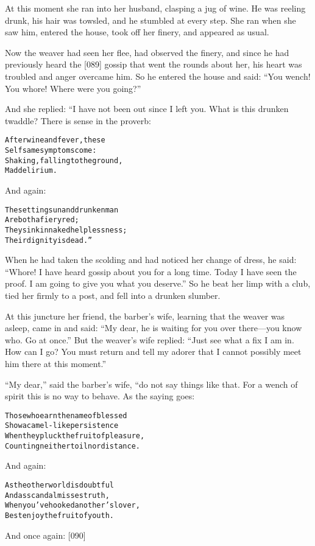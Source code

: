 \documentclass{article}
\renewenvironment{verbatim}{\begin{alltt}\normalfont\begin{centering}}{\end{centering}\end{alltt}}
\begin{document}
At this moment she ran into her husband, clasping a jug of wine. He
was reeling drunk, his hair was towsled, and he stumbled at every
step. She ran when she saw him, entered the house, took off her
finery, and appeared as usual.

Now the weaver had seen her flee, had observed the finery, and
since he had previously heard the [089] gossip that went the rounds
about her, his heart was troubled and anger overcame him. So he
entered the house and said:
``You wench! You whore! Where were you going?''

And she replied: “I have not been out since I left you. What is
this drunken twaddle? There is sense in the proverb:

\begin{verbatim}
After wine and fever, these
    Selfsame symptoms come:
Shaking, falling to the ground,
    Mad delirium.
\end{verbatim}
And again:

\begin{verbatim}
The setting sun and drunken man
    Are both a fiery red;
They sink in naked helplessness;
    Their dignity is dead.”
\end{verbatim}
When he had taken the scolding and had noticed her change of dress,
he said:
``Whore! I have heard gossip about you for a long time. Today I have seen the proof. I am going to give you what you deserve.''
So he beat her limp with a club, tied her firmly to a post, and
fell into a drunken slumber.

At this juncture her friend, the barber's wife, learning that the
weaver was asleep, came in and said:
``My dear, he is waiting for you over there---you know who. Go at once.''
But the weaver's wife replied:
``Just see what a fix I am in. How can I go? You must return and tell my adorer that I cannot possibly meet him there at this moment.''

``My dear,'' said the barber's wife, “do not say things like that.
For a wench of spirit this is no way to behave. As the saying
goes:

\begin{verbatim}
Those who earn the name of blessed
    Show a camel-like persistence
When they pluck the fruit of pleasure,
    Counting neither toil nor distance.
\end{verbatim}
And again:

\begin{verbatim}
As the other world is doubtful
    And as scandal misses truth,
When you've hooked another's lover,
    Best enjoy the fruit of youth.
\end{verbatim}
And once again: [090]
\end{document}

